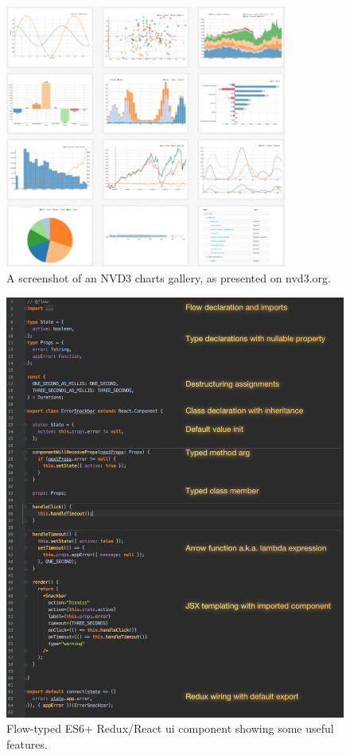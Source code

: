 \begin{figure}[h]
  \centering
  \includegraphics[width=0.825\textwidth]{figures/architecture/nvd3-gallery}
  \caption{A screenshot of an NVD3 charts gallery, as presented on nvd3.org.}
  \label{fig:nvd3-gallery}
\end{figure}

\begin{figure}[h]
  \centering
  \includegraphics[width=1.05\textwidth]{figures/architecture/react-flow-sample}
  \caption{Flow-typed ES6+ Redux/React \gls{ui} component showing some useful features.}
  \label{fig:react-flow-sample}
\end{figure}
